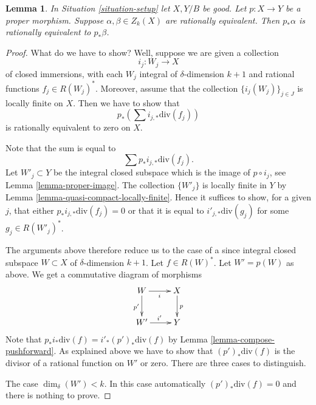 \documentclass{stacks-project}
\theoremstyle{plain}
\newtheorem{lemma}[subsection]{Lemma}
\theoremstyle{definition}
\theoremstyle{remark}
\numberwithin{equation}{subsection}
\begin{document}
\begin{lemma}
\label{lemma-proper-pushforward-rational-equivalence}
In Situation \ref{situation-setup} let $X, Y/B$ be good.
Let $p : X \to Y$ be a proper morphism.
Suppose $\alpha, \beta \in Z_k(X)$ are rationally equivalent.
Then $p_*\alpha$ is rationally equivalent to $p_*\beta$.
\end{lemma}

\begin{proof}
What do we have to show? Well, suppose we are given a collection
$$
i_j : W_j \longrightarrow X
$$
of closed immersions, with each $W_j$ integral of $\delta$-dimension $k + 1$
and rational functions $f_j \in R(W_j)^*$.
Moreover, assume that
the collection $\{i_j(W_j)\}_{j \in J}$ is locally finite on $X$.
Then we have to show that
$$
p_*\left(\sum i_{j, *}\text{div}(f_j)\right)
$$
is rationally equivalent to zero on $X$.

\medskip\noindent
Note that the sum is equal to
$$
\sum p_*i_{j, *}\text{div}(f_j).
$$
Let $W'_j \subset Y$ be the integral closed subspace which is the
image of $p \circ i_j$, see Lemma \ref{lemma-proper-image}.
The collection $\{W'_j\}$ is locally finite
in $Y$ by Lemma \ref{lemma-quasi-compact-locally-finite}.
Hence it suffices to show, for a given $j$, that either
$p_*i_{j, *}\text{div}(f_j) = 0$ or that it
is equal to $i'_{j, *}\text{div}(g_j)$ for some $g_j \in R(W'_j)^*$.

\medskip\noindent
The arguments above therefore reduce us to the case of a since
integral closed subspace $W \subset X$ of $\delta$-dimension $k + 1$.
Let $f \in R(W)^*$. Let $W' = p(W)$ as above.
We get a commutative diagram of morphisms
$$
\xymatrix{
W \ar[r]_i \ar[d]_{p'} & X \ar[d]^p \\
W' \ar[r]^{i'} & Y
}
$$
Note that $p_*i_*\text{div}(f) = i'_*(p')_*\text{div}(f)$ by
Lemma \ref{lemma-compose-pushforward}. As explained above
we have to show that $(p')_*\text{div}(f)$
is the divisor of a rational function on $W'$ or zero.
There are three cases to distinguish.

\medskip\noindent
The case $\dim_\delta(W') < k$. In this case automatically
$(p')_*\text{div}(f) = 0$ and there is nothing to prove.


\end{proof}
\end{document}
